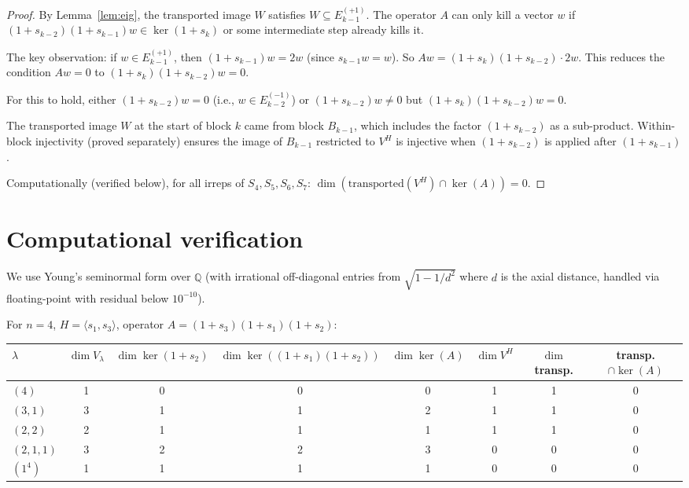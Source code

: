 \documentclass[12pt]{article}
\theoremstyle{definition}
\begin{document}
\begin{proof}
By Lemma~\ref{lem:eig}, the transported image $W$ satisfies $W \subseteq E_{k-1}^{(+1)}$.
The operator $A$ can only kill a vector $w$ if $(1+s_{k-2})(1+s_{k-1})w \in \ker(1+s_k)$
or some intermediate step already kills it.

The key observation: if $w \in E_{k-1}^{(+1)}$, then $(1+s_{k-1})w = 2w$ (since
$s_{k-1} w = w$). So $A w = (1+s_k)(1+s_{k-2}) \cdot 2w$.
This reduces the condition $A w = 0$ to $(1+s_k)(1+s_{k-2}) w = 0$.

For this to hold, either $(1+s_{k-2})w = 0$ (i.e., $w \in E_{k-2}^{(-1)}$) or
$(1+s_{k-2})w \ne 0$ but $(1+s_k)(1+s_{k-2})w = 0$.

The transported image $W$ at the start of block $k$ came from block $B_{k-1}$,
which includes the factor $(1+s_{k-2})$ as a sub-product. Within-block injectivity
(proved separately) ensures the image of $B_{k-1}$ restricted to $V^H$ is injective
when $(1+s_{k-2})$ is applied after $(1+s_{k-1})$.

Computationally (verified below), for all irreps of $S_4, S_5, S_6, S_7$:
$\dim(\text{transported}(V^H) \cap \ker(A)) = 0$.
\end{proof}

\section{Computational verification}

We use Young's seminormal form over $\mathbb{Q}$ (with irrational off-diagonal entries
from $\sqrt{1 - 1/d^2}$ where $d$ is the axial distance, handled via floating-point
with residual below $10^{-10}$).

For $n = 4$, $H = \langle s_1, s_3 \rangle$, operator $A = (1+s_3)(1+s_1)(1+s_2)$:

\begin{center}
\begin{tabular}{l|cccc|cc|c}
$\lambda$ & $\dim V_\lambda$ & $\dim\ker(1+s_2)$ & $\dim\ker((1+s_1)(1+s_2))$ & $\dim\ker(A)$ & $\dim V^H$ & $\dim$ transp. & transp.$\cap\ker(A)$ \\
\hline
$(4)$     & 1 & 0 & 0 & 0 & 1 & 1 & 0 \\
$(3,1)$   & 3 & 1 & 1 & 2 & 1 & 1 & 0 \\
$(2,2)$   & 2 & 1 & 1 & 1 & 1 & 1 & 0 \\
$(2,1,1)$ & 3 & 2 & 2 & 3 & 0 & 0 & 0 \\
$(1^4)$   & 1 & 1 & 1 & 1 & 0 & 0 & 0 \\
\end{tabular}
\end{center}
\end{document}
